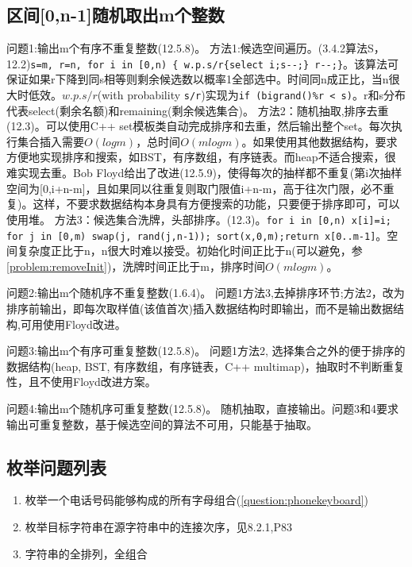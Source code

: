 \subsection{区间[0,n-1]随机取出m个整数}

问题1:输出m个有序不重复整数(\cite{pp}12.5.8)。
方法1:候选空间遍历。(\cite{acp}3.4.2算法S，\cite{pp}12.2)\verb|s=m, r=n, for i in [0,n) { w.p.s/r{select i;s--;} r--;}|。该算法可保证如果r下降到同s相等则剩余候选数以概率1全部选中。时间同n成正比，当n很大时低效。$w.p.s/r$(with probability \verb|s/r|)实现为\verb|if (bigrand()%r < s)|。r和s分布代表select(剩余名额)和remaining(剩余候选集合)。
方法2：随机抽取,排序去重(\cite{pp}12.3)。可以使用C++ set模板类自动完成排序和去重，然后输出整个set。每次执行集合插入需要$O(logm)$，总时间$O(mlog m)$。如果使用其他数据结构\cite{self}，要求方便地实现排序和搜索，如BST，有序数组，有序链表。而heap不适合搜索，很难实现去重。Bob Floyd给出了改进(\cite{pp}12.5.9)，使得每次的抽样都不重复(第i次抽样空间为[0,i+n-m]，且如果同以往重复则取门限值i+n-m，高于往次门限，必不重复)。这样，不要求数据结构本身具有方便搜索的功能，只要便于排序即可，可以使用堆。
方法3：候选集合洗牌，头部排序。(\cite{pp}12.3)。\verb|for i in [0,n) x[i]=i; for j in [0,m) swap(j, rand(j,n-1)); sort(x,0,m);return x[0..m-1]|。空间复杂度正比于n，n很大时难以接受。初始化时间正比于n(可以避免，参\ref{problem:removeInit})，洗牌时间正比于m，排序时间$O(mlogm)$。

问题2:输出m个随机序不重复整数(\cite{pp}1.6.4)。
问题1方法3,去掉排序环节;方法2，改为排序前输出，即每次取样值(该值首次)插入数据结构时即输出，而不是输出数据结构,可用使用Floyd改进。

问题3:输出m个有序可重复整数(\cite{pp}12.5.8)。
问题1方法2, 选择集合之外的便于排序的数据结构(heap, BST, 有序数组，有序链表，C++ multimap)，抽取时不判断重复性，且不使用Floyd改进方案。

问题4:输出m个随机序可重复整数(\cite{pp}12.5.8)。
随机抽取，直接输出。问题3和4要求输出可重复整数，基于候选空间的算法不可用，只能基于抽取。








\subsection{枚举问题列表}
\begin{enumerate}
    \item 枚举一个电话号码能够构成的所有字母组合(\ref{question:phonekeyboard})
    \item 枚举目标字符串在源字符串中的连接次序，见\cite{pibible}8.2.1,P83
    \item 字符串的全排列，全组合
\end{enumerate}

















